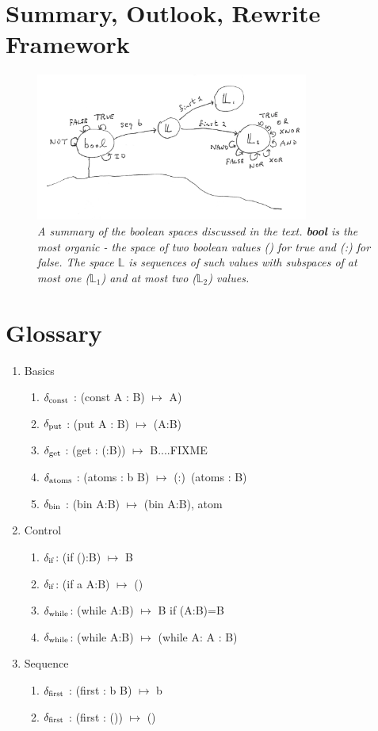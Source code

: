 \documentclass[11pt]{article}
\begin{document}
\section{Summary, Outlook, Rewrite Framework} 


\begin{figure}[h]
\centering
\includegraphics[width=0.8\textwidth]{bool.png}
\caption{{\it A summary of the boolean spaces discussed in the text.  {\bf bool} is the most organic - the space of two boolean values () for true and (:) for false.  The space $\mathbb L$ is sequences of such values with subspaces of at most one (${\mathbb L}_1$) and at most two (${\mathbb L}_2$) values.}}
\end{figure}


\section{Glossary}

\begin{enumerate}
\item {Basics
\begin{enumerate}
\item{$\delta_{\rm const}$ : (const A : B) $\mapsto$ A)}
\item{$\delta_{\rm put}$ : (put A : B) $\mapsto$ (A:B)}
\item{$\delta_{\rm get}$ : (get : (:B)) $\mapsto$ B....FIXME}
\item{$\delta_{\rm atoms}$ : (atoms : b B) $\mapsto$ (:)\ (atoms : B)}
\item{$\delta_{\rm bin}$ : (bin A:B) $\mapsto$ (bin A:B), atom}
\end{enumerate}
}
\item {Control
\begin{enumerate}
\item{$\delta_{\rm if}$: (if ():B) $\mapsto$ B }
\item{$\delta_{\rm if}$: (if a A:B) $\mapsto$ () }
\item{$\delta_{\rm while}$: (while A:B) $\mapsto$ B if (A:B)=B }
\item{$\delta_{\rm while}$: (while A:B) $\mapsto$ (while A: A : B) }
\end{enumerate}
}
\item{Sequence 
\begin{enumerate}
\item{$\delta_{\rm first}$ : (first : b B) $\mapsto$ b}
\item{$\delta_{\rm first}$ : (first : ()) $\mapsto$ ()} 
\end{enumerate} 
}
\end{enumerate}
\end{document}
